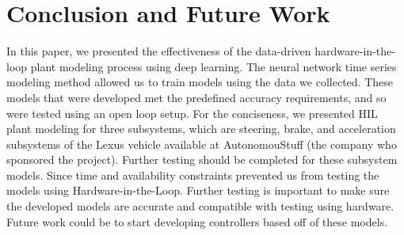 \documentclass[conference]{IEEEtran}
\begin{document}
\section{Conclusion and Future Work}
\label{sec:conclustionAndFutureWork}

In this paper, we presented the effectiveness of the data-driven hardware-in-the-loop plant modeling process using deep learning. The neural network time series modeling method  allowed us to train models using the data we collected. These models that were developed met the predefined accuracy requirements, and so were tested using an open loop setup. For the conciseness, we  presented HIL plant modeling for three subsystems, which are steering, brake, and acceleration subsystems of the Lexus vehicle available at AutonomouStuff (the company who sponsored the project). Further testing should be completed for these subsystem models. Since time and availability constraints prevented us from testing the models using Hardware-in-the-Loop. Further testing is important to make sure the developed models are accurate and compatible with testing using hardware. Future work  could be to start developing controllers based off of these models.

\clearpage


\end{document}
